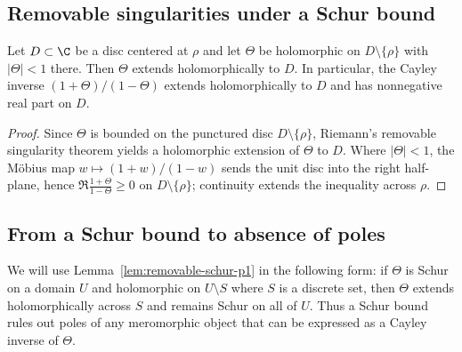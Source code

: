 \documentclass[11pt]{article}
\begin{document}
\subsection*{Removable singularities under a Schur bound}
\begin{lemma}\label{lem:removable-schur-p1}
Let $D\subset\C$ be a disc centered at $\rho$ and let $\Theta$ be holomorphic on $D\setminus\{\rho\}$ with $|\Theta|<1$ there.
Then $\Theta$ extends holomorphically to $D$.
In particular, the Cayley inverse $(1+\Theta)/(1-\Theta)$ extends holomorphically to $D$ and has nonnegative real part on $D$.
\end{lemma}
\begin{proof}
Since $\Theta$ is bounded on the punctured disc $D\setminus\{\rho\}$, Riemann's removable singularity theorem yields a holomorphic extension of $\Theta$ to $D$.
Where $|\Theta|<1$, the Möbius map $w\mapsto (1+w)/(1-w)$ sends the unit disc into the right half-plane, hence $\Re\frac{1+\Theta}{1-\Theta}\ge 0$ on $D\setminus\{\rho\}$; continuity extends the inequality across $\rho$.
\end{proof}

\subsection*{From a Schur bound to absence of poles}
We will use Lemma~\ref{lem:removable-schur-p1} in the following form: if $\Theta$ is Schur on a domain $U$ and holomorphic on $U\setminus S$ where $S$ is a discrete set, then $\Theta$ extends holomorphically across $S$ and remains Schur on all of $U$.
Thus a Schur bound rules out poles of any meromorphic object that can be expressed as a Cayley inverse of $\Theta$.
\end{document}
